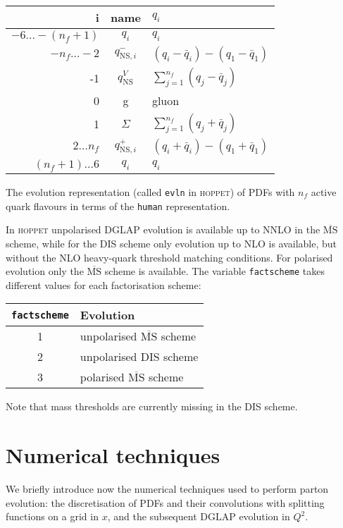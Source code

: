 \documentclass[12pt]{article}
\newcommand{\MSbar}{\overline{\mathrm{MS}}}
\newcommand{\hoppet}{\textsc{hoppet}\xspace}
\newcommand{\ttt}[1]{\texttt{#1}}
\begin{document}
\begin{table}
\begin{center}
\begin{tabular}{|r | c | l |}
\hline
     i & \mbox{name} & $q_i$ \\ \hline
     $ -6\ldots-(n_f+1)$ & $q_i$ & $q_i$\\
     $-n_f\ldots -2$ & $q_{\mathrm{NS},i}^{-}$ & 
$(q_i -  {\bar q}_i) - (q_1 - {\bar q}_1)$\\
      -1           & $q_{\mathrm{NS}}^{V}$ & 
$\sum_{j=1}^{n_f} (q_j -  {\bar q}_j)$\\
       0           & g & \textrm{gluon} \\
       1           & $\Sigma$ & $\sum_{j=1}^{n_f} (q_j +  {\bar q}_j)$\\
     $2\ldots n_f$ & $q_{\mathrm{NS},i}^{+}$ &
$ (q_i +  {\bar q}_i) - (q_1 + {\bar q}_1)$\\
      $(n_f+1)\ldots6$ & $q_i$ & $q_i$ \\
\hline
\end{tabular}
\caption{}{\label{eq:diag_split} The evolution representation 
(called \ttt{evln} in \hoppet)
of PDFs with $n_f$ active quark flavours
in terms of the \ttt{human} representation.}  
\end{center}
\end{table}

In \hoppet unpolarised DGLAP evolution is available up to NNLO
in the $\MSbar$ scheme, while for the DIS scheme
only evolution up to NLO is available, but without the NLO heavy-quark
threshold matching conditions. For polarised evolution only
the $\MSbar$ scheme is available. The variable \ttt{factscheme}
takes different values for each factorisation scheme:
\begin{center}
  \begin{tabular}{|c|l|}\hline
    \ttt{factscheme} & Evolution\\[2pt]\hline
    1 & unpolarised $\MSbar$ scheme\\[2pt]\hline
    2 & unpolarised DIS scheme\\[2pt]\hline
    3 & polarised $\MSbar$ scheme\\\hline
  \end{tabular}
\end{center}
Note that mass thresholds are currently
missing in the DIS scheme.

\section{Numerical techniques}
\label{tricks}
We briefly introduce now the numerical techniques used to perform
parton evolution: the discretisation of PDFs and
their convolutions with splitting functions on a grid in $x$,
and the subsequent DGLAP evolution in $Q^2$. 
\end{document}
